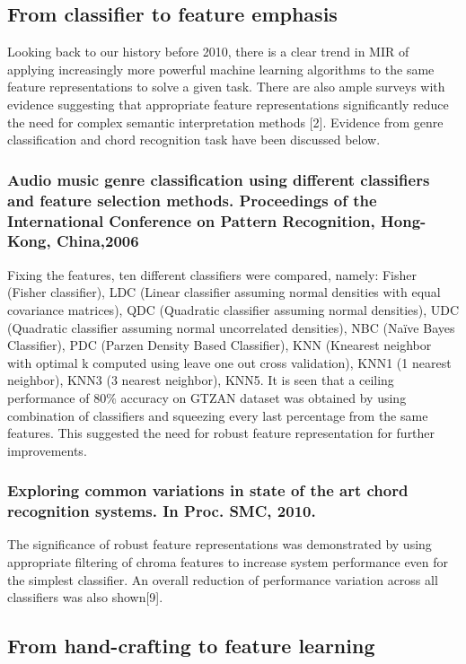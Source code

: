 \subsection{From classifier to feature emphasis}
Looking back to our history before 2010, there is a clear trend in MIR of applying increasingly more powerful machine learning algorithms to the same feature representations to solve a given task. There are also ample surveys with evidence suggesting that appropriate feature representations significantly reduce the need for complex semantic interpretation methods [2]. Evidence from genre classification and chord recognition task have been discussed below. 

\subsubsection{Audio music genre classification using different classifiers and feature selection methods. Proceedings of the International Conference on Pattern Recognition, Hong-Kong, China,2006}
Fixing the features, ten different classifiers were compared, namely: Fisher (Fisher classifier), LDC (Linear classifier assuming normal densities with equal covariance matrices), QDC (Quadratic classifier assuming normal densities), UDC (Quadratic classifier assuming normal uncorrelated densities), NBC (Naïve Bayes Classifier), PDC (Parzen Density Based Classifier), KNN (Knearest neighbor with optimal k computed using leave one out cross validation), KNN1 (1 nearest neighbor), KNN3 (3 nearest neighbor), KNN5.  It is seen that a ceiling performance of 80\% accuracy on GTZAN dataset was obtained by using combination of classifiers and squeezing every last percentage from the same features. This suggested the need for robust feature representation for further improvements.

\subsubsection{Exploring common variations in state of the art chord recognition systems. In Proc. SMC, 2010.}
The significance of robust feature representations was demonstrated by using appropriate filtering of chroma features to increase system performance even for the simplest classifier. An overall reduction of performance variation across all classifiers was also shown[9].

\subsection{From hand-crafting to feature learning}
 
